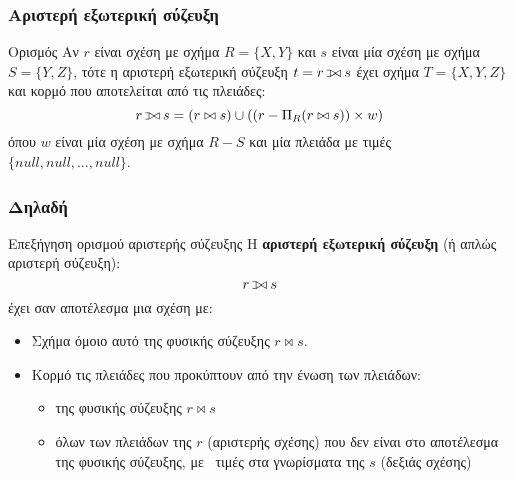 \begin{frame}
\frametitle{Αριστερή εξωτερική σύζευξη}
\begin{minipage}{\wE}
  \begin{block}{Ορισμός}
    Αν $r$ είναι σχέση με σχήμα $R=\{X,Y\}$
    και $s$ είναι μία σχέση
    με σχήμα $S=\{Y,Z\}$, τότε η αριστερή εξωτερική σύζευξη
    $t = r \lojoin s$ έχει σχήμα $T=\{X,Y,Z\}$ και κορμό
    που αποτελείται από τις πλειάδες:
    \[
       r \lojoin s = (r \bowtie s) \cup \left((r - \Pi_R (r \bowtie s)\right) \times w )
    \]
    όπου $w$ είναι μία σχέση με σχήμα $R-S$ και μία πλειάδα με τιμές $\{null, null, \ldots, null\}$.
  \end{block}
\end{minipage}
\end{frame}


\begin{frame}
\frametitle{Δηλαδή}
\begin{minipage}{\wE}
  \begin{block}{Επεξήγηση ορισμού αριστερής σύζευξης}
     Η {\bf αριστερή εξωτερική σύζευξη} (ή απλώς αριστερή σύζευξη):
     \[  r \lojoin s  \]
     έχει σαν αποτέλεσμα μια σχέση με:

    \begin{itemize}
      \item Σχήμα όμοιο αυτό της φυσικής σύζευξης $r \bowtie s$.
      \item Κορμό τις πλειάδες που προκύπτουν από την ένωση των πλειάδων:
      \begin{itemize}
        \item της φυσικής σύζευξης $r \bowtie s$
        \item όλων των πλειάδων της $r$ (αριστερής σχέσης) που δεν είναι
              στο αποτέλεσμα της φυσικής σύζευξης,
              με \tnull\ τιμές στα γνωρίσματα της $s$ (δεξιάς σχέσης)
      \end{itemize}
    \end{itemize} 
  \end{block}
\end{minipage}
\end{frame}



